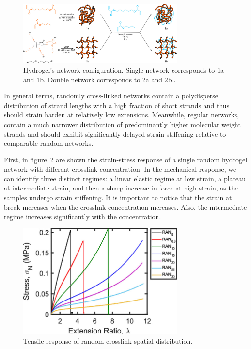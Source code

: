 \begin{figure}[ht!]
    \centering
    \includegraphics[width=0.75\textwidth]{figs/explainMechResponse/RAN-REG-networks.jpeg}
    \caption{Hydrogel's network configuration.
        Single network corresponds to 1a and 1b. 
        Double network corresponds to 2a and 2b.\citep{kongEffectCrossLinkHomogeneity2024}.}\label{fig:RANREGnetworks}
\end{figure}

In general terms, randomly cross-linked networks contain a polydisperse distribution of strand lengths with a high fraction of short strands and thus should strain harden at relatively low extensions. 
Meanwhile, regular networks, contain a much narrower distribution of predominantly higher molecular weight strands and should exhibit significantly delayed strain stiffening relative to comparable random networks.

First, in figure~\ref{fig:RANnetworks} are shown the strain-stress response of a single random hydrogel network with different crosslink concentration.
In the mechanical response, we can identify three distinct regimes: a linear elastic regime at low strain, a plateau at intermediate strain, and then a sharp increase in force at high strain, as the samples undergo strain stiffening.
It is important to notice that the strain at break increases when the crosslink concentration increases.
Also, the intermediate regime increases significantly with the concentration.

\begin{figure}[ht!]
    \centering
    \includegraphics[width=0.75\textwidth]{figs/explainMechResponse/singleRANtensile.jpeg}
    \caption{Tensile response of random crosslink spatial distribution\citep{kongEffectCrossLinkHomogeneity2024}.}\label{fig:RANnetworks}
\end{figure}

